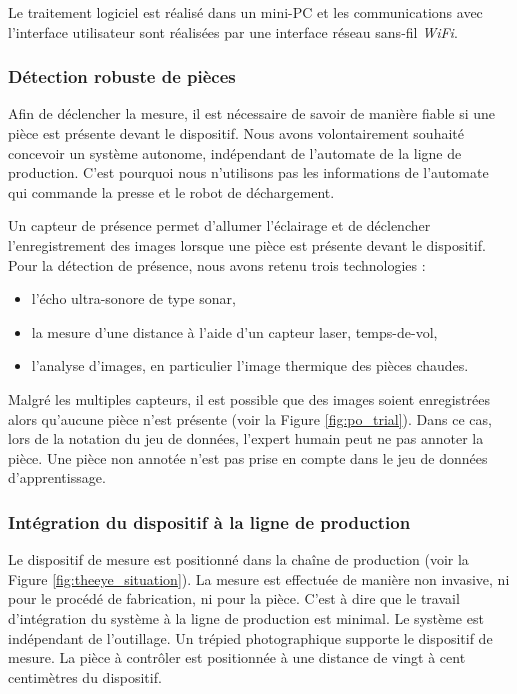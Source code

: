 Le traitement logiciel est réalisé dans un mini-PC et les communications avec l'interface utilisateur sont réalisées par une interface réseau sans-fil \textit{WiFi}.

\FloatBarrier
\subsubsection{Détection robuste de pièces}
Afin de déclencher la mesure, il est nécessaire de savoir de manière fiable si une pièce est présente devant le dispositif.
Nous avons volontairement souhaité concevoir un système autonome, indépendant de l'automate de la ligne de production.
C'est pourquoi nous n'utilisons pas les informations de l'automate qui commande la presse et le robot de déchargement.

Un capteur de présence permet d'allumer l'éclairage et de déclencher l'enregistrement des images lorsque une pièce est présente devant le dispositif.
Pour la détection de présence, nous avons retenu trois technologies :
\begin{itemize}
	\item l'écho ultra-sonore de type sonar,
	\item la mesure d'une distance à l'aide d'un capteur laser, temps-de-vol,
	\item l'analyse d'images, en particulier l'image thermique des pièces chaudes.
\end{itemize}

\noindent
Malgré les multiples capteurs, il est possible que des images soient enregistrées alors qu'aucune pièce n'est présente (voir la Figure \ref{fig:po_trial}).
Dans ce cas, lors de la notation du jeu de données, l'expert humain peut ne pas annoter la pièce.
Une pièce non annotée n'est pas prise en compte dans le jeu de données d'apprentissage.

\subsubsection{Intégration du dispositif à la ligne de production}
Le dispositif de mesure est positionné dans la chaîne de production (voir la Figure \ref{fig:theeye_situation}).
La mesure est effectuée de manière non invasive, ni pour le procédé de fabrication, ni pour la pièce.
C'est à dire que le travail d'intégration du système à la ligne de production est minimal.
Le système est indépendant de l’outillage.
Un trépied photographique supporte le dispositif de mesure.
La pièce à contrôler est positionnée à une distance de vingt à cent centimètres du dispositif.

